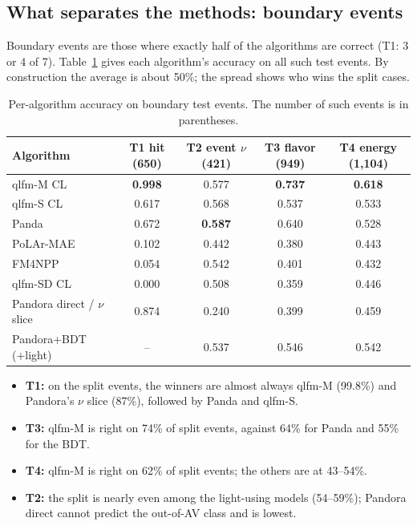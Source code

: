 \documentclass[11pt,a4paper]{article}
\newcommand{\best}[1]{\textbf{#1}}
\begin{document}
\subsection{What separates the methods: boundary events}
Boundary events are those where exactly half of the algorithms are correct (T1: 3 or 4 of 7). Table~\ref{tab:bnd} gives each algorithm's accuracy on all such test events. By construction the average is about 50\%; the spread shows who wins the split cases.
\begin{table}[H]\centering\small
\caption{Per-algorithm accuracy on boundary test events. The number of such events is in parentheses.}\label{tab:bnd}
\begin{tabular}{lcccc}
\toprule
Algorithm & T1 hit (650) & T2 event $\nu$ (421) & T3 flavor (949) & T4 energy (1{,}104)\\
\midrule
qlfm-M CL & \best{0.998} & 0.577 & \best{0.737} & \best{0.618}\\
qlfm-S CL & 0.617 & 0.568 & 0.537 & 0.533\\
Panda & 0.672 & \best{0.587} & 0.640 & 0.528\\
PoLAr-MAE & 0.102 & 0.442 & 0.380 & 0.443\\
FM4NPP & 0.054 & 0.542 & 0.401 & 0.432\\
qlfm-SD CL & 0.000 & 0.508 & 0.359 & 0.446\\
Pandora direct / $\nu$ slice & 0.874 & 0.240 & 0.399 & 0.459\\
Pandora+BDT (+light) & -- & 0.537 & 0.546 & 0.542\\
\bottomrule
\end{tabular}
\end{table}
\begin{itemize}
  \item \textbf{T1:} on the split events, the winners are almost always qlfm-M (99.8\%) and Pandora's $\nu$ slice (87\%), followed by Panda and qlfm-S.
  \item \textbf{T3:} qlfm-M is right on 74\% of split events, against 64\% for Panda and 55\% for the BDT.
  \item \textbf{T4:} qlfm-M is right on 62\% of split events; the others are at 43--54\%.
  \item \textbf{T2:} the split is nearly even among the light-using models (54--59\%); Pandora direct cannot predict the out-of-AV class and is lowest.
\end{itemize}
\end{document}
